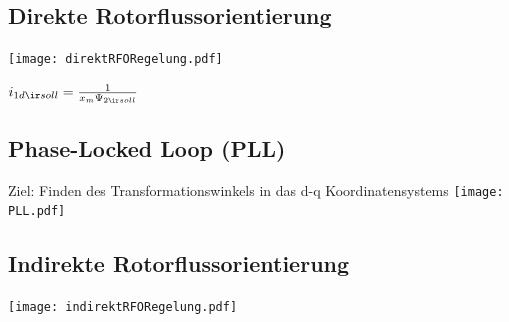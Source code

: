 \documentclass[fs, german]{latex4ei_fs}
\begin{document}
\begin{sectionbox}

\subsection{Direkte Rotorflussorientierung} 

\texttt{[image: direktRFORegelung.pdf]}


$i_{1d \ir soll} = \frac{1}{x_{m} \Psi_{2\ir soll}}$
\end{sectionbox}

\begin{sectionbox}

\subsection{Phase-Locked Loop (PLL)} 

Ziel: Finden des Transformationswinkels in das d-q Koordinatensystems
\texttt{[image: PLL.pdf]}
\end{sectionbox}
\begin{sectionbox}

\subsection{Indirekte Rotorflussorientierung} 
\texttt{[image: indirektRFORegelung.pdf]}
\end{sectionbox}
\end{document}
